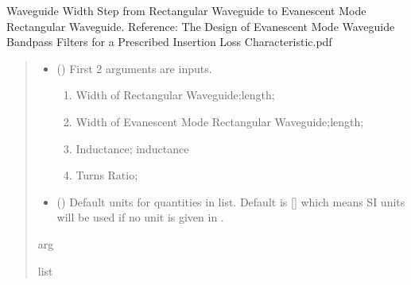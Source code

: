 \documentclass[letterpaper,10pt,english]{sphinxmanual}
\begin{document}

\begin{fulllineitems}
\label{\detokenize{components:components.RectWG2EvanescentRectWGStep}}
\pysigstartsignatures
{}
\pysigstopsignatures
\sphinxAtStartPar
Waveguide Width Step from Rectangular Waveguide to Evanescent Mode Rectangular Waveguide.
Reference:  The Design of Evanescent Mode Waveguide Bandpass Filters for a Prescribed Insertion Loss Characteristic.pdf
\begin{quote}\begin{description}
\begin{itemize}
\item {} 
\sphinxAtStartPar
{} () \textendash{} 
\sphinxAtStartPar
First 2 arguments are inputs.
\begin{enumerate}
%
\item {} 
\sphinxAtStartPar
Width of Rectangular Waveguide;length;

\item {} 
\sphinxAtStartPar
Width of Evanescent Mode Rectangular Waveguide;length;

\item {} 
\sphinxAtStartPar
Inductance; inductance

\item {} 
\sphinxAtStartPar
Turns Ratio;

\end{enumerate}


\item {} 
\sphinxAtStartPar
{} (\sphinxstyleliteralemphasis{\sphinxupquote{, }}) \textendash{} Default units for quantities in  list. Default is {[}{]} which means SI units will be used if no unit is given in .

\end{itemize}

\sphinxAtStartPar
arg

\sphinxAtStartPar
list

\end{description}\end{quote}

\end{fulllineitems}
\end{document}

